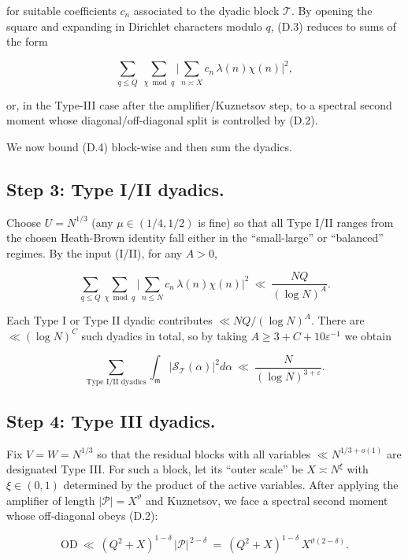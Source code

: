 \documentclass[11pt]{article}
\theoremstyle{definition}
\theoremstyle{remark}
\begin{document}
for suitable coefficients $c_n$ associated to the dyadic block $\mathcal T$. By opening the square and expanding in Dirichlet characters modulo $q$, (D.3) reduces to sums of the form

\begin{equation}
	\sum_{q\le Q}\ \sum_{\chi\bmod q}
	\Big|\sum_{n\asymp X} c_n\,\lambda(n)\chi(n)\Big|^2,
	\tag{D.4}
\end{equation}

or, in the Type-III case after the amplifier/Kuznetsov step, to a spectral second moment whose diagonal/off-diagonal split is controlled by (D.2).

We now bound (D.4) block-wise and then sum the dyadics.


\subsection*{Step 3: Type I/II dyadics.}
Choose $U=N^{1/3}$ (any $\mu\in(1/4,1/2)$ is fine) so that all Type I/II ranges from the chosen Heath-Brown identity fall either in the “small-large” or “balanced” regimes. By the input (I/II), for any $A>0$,

$$
	\sum_{q\le Q}\sum_{\chi\bmod q}
	\Big|\sum_{n\le N} c_n\,\lambda(n)\chi(n)\Big|^2
	\ \ll\ \frac{NQ}{(\log N)^A}.
$$

Each Type I or Type II dyadic contributes $\ll NQ/(\log N)^A$. There are $\ll(\log N)^C$ such dyadics in total, so by taking $A\ge 3+C+10\varepsilon^{-1}$ we obtain

\begin{equation}
	\sum_{\text{Type I/II dyadics}}
	\int_{\mathfrak m}\big|\mathcal S_{\mathcal T}(\alpha)\big|^2 d\alpha
	\ \ll\ \frac{N}{(\log N)^{3+\varepsilon}}.
	\tag{D.5}
\end{equation}

\subsection*{Step 4: Type III dyadics.}
Fix $V=W=N^{1/3}$ so that the residual blocks with all variables $\ll N^{1/3+o(1)}$ are designated Type III. For such a block, let its “outer scale” be $X\asymp N^\xi$ with $\xi\in(0,1)$ determined by the product of the active variables. After applying the amplifier of length $|\mathcal P|=X^\vartheta$ and Kuznetsov, we face a spectral second moment whose off-diagonal obeys (D.2):

$$
	\mathrm{OD}\ \ll\ (Q^2+X)^{1-\delta}\,|\mathcal P|^{\,2-\delta}
	\ =\ (Q^2+X)^{1-\delta}\,X^{\vartheta(2-\delta)}.
$$
\end{document}
